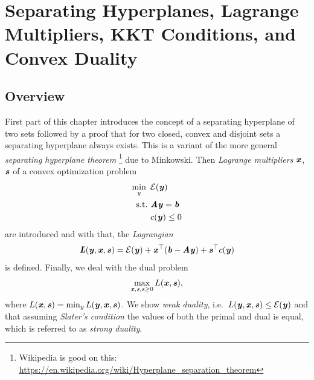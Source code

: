 \chapter{Separating Hyperplanes, Lagrange Multipliers, KKT Conditions, and Convex Duality}
%
%




%

\sloppy

\section{Overview}
First part of this chapter introduces the concept of a separating hyperplane of two sets followed by a proof that for two closed, convex and disjoint sets a separating hyperplane always exists.
This is a variant of the more general \emph{separating hyperplane theorem}%
\footnote{Wikipedia is good on this: \href{https://en.wikipedia.org/wiki/Hyperplane_separation_theorem}{https://en.wikipedia.org/wiki/Hyperplane\_separation\_theorem}} %
due to Minkowski.
Then \emph{Lagrange multipliers} $\xx$, $\ss$ of a convex optimization
problem
\begin{align*}
    \min_y{}\ & \energy(\yy) \\ \nonumber
\text{s.t.}\  & \AA\yy = \bb \\ \nonumber
              & c(\yy) \leq 0
\end{align*}
are introduced and with that, the \emph{Lagrangian} \begin{equation*} \LL(\yy, \xx, \ss) = \energy(\yy) + \xx^{\trp}(\bb - \AA\yy) + \ss^{\trp}c(\yy) \end{equation*}
is defined.
Finally, we deal with the dual problem
\begin{align*}
     \max_{\xx, \ss, \ss \geq 0}{} L(\xx,  \ss),
\end{align*}
where $L(\xx, \ss) = \min_y L(\yy, \xx, \ss)$. We show \emph{weak
  duality}, i.e.\ $L(\yy, \xx, \ss) \leq \energy(\yy)$ and that assuming \emph{Slater's condition} the values of both the primal and dual is equal, which is referred to as \emph{strong duality}.

